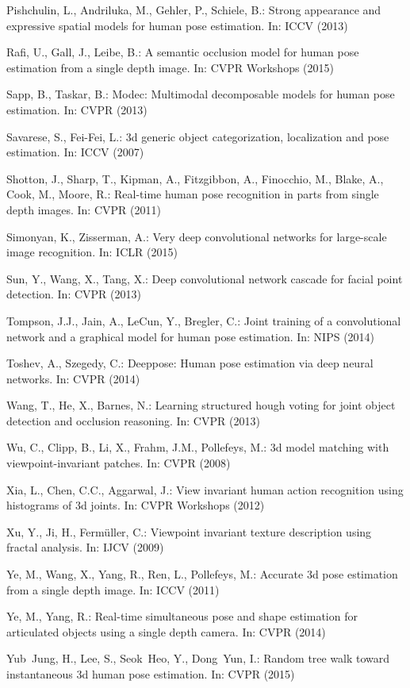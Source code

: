 \documentclass[runningheads]{llncs}
\begin{document}
\begin{thebibliography}{10}
	Pishchulin, L., Andriluka, M., Gehler, P., Schiele, B.: Strong appearance and
	expressive spatial models for human pose estimation. In: ICCV (2013)

	Rafi, U., Gall, J., Leibe, B.: A semantic occlusion model for human pose
	estimation from a single depth image. In: CVPR Workshops (2015)

	Sapp, B., Taskar, B.: Modec: Multimodal decomposable models for human pose
	estimation. In: CVPR (2013)

	Savarese, S., Fei-Fei, L.: 3d generic object categorization, localization and
	pose estimation. In: ICCV (2007)

	Shotton, J., Sharp, T., Kipman, A., Fitzgibbon, A., Finocchio, M., Blake, A.,
	Cook, M., Moore, R.: Real-time human pose recognition in parts from single
	depth images. In: CVPR (2011)

	Simonyan, K., Zisserman, A.: Very deep convolutional networks for large-scale
	image recognition. In: ICLR (2015)

	Sun, Y., Wang, X., Tang, X.: Deep convolutional network cascade for facial
	point detection. In: CVPR (2013)

	Tompson, J.J., Jain, A., LeCun, Y., Bregler, C.: Joint training of a
	convolutional network and a graphical model for human pose estimation. In:
	NIPS (2014)

	Toshev, A., Szegedy, C.: Deeppose: Human pose estimation via deep neural
	networks. In: CVPR (2014)

	Wang, T., He, X., Barnes, N.: Learning structured hough voting for joint object
	detection and occlusion reasoning. In: CVPR (2013)

	Wu, C., Clipp, B., Li, X., Frahm, J.M., Pollefeys, M.: 3d model matching with
	viewpoint-invariant patches. In: CVPR (2008)

	Xia, L., Chen, C.C., Aggarwal, J.: View invariant human action recognition
	using histograms of 3d joints. In: CVPR Workshops (2012)

	Xu, Y., Ji, H., Ferm{\"u}ller, C.: Viewpoint invariant texture description
	using fractal analysis. In: IJCV (2009)

	Ye, M., Wang, X., Yang, R., Ren, L., Pollefeys, M.: Accurate 3d pose estimation
	from a single depth image. In: ICCV (2011)

	Ye, M., Yang, R.: Real-time simultaneous pose and shape estimation for
	articulated objects using a single depth camera. In: CVPR (2014)

	Yub~Jung, H., Lee, S., Seok~Heo, Y., Dong~Yun, I.: Random tree walk toward
	instantaneous 3d human pose estimation. In: CVPR (2015)

\end{thebibliography}
\end{document}
